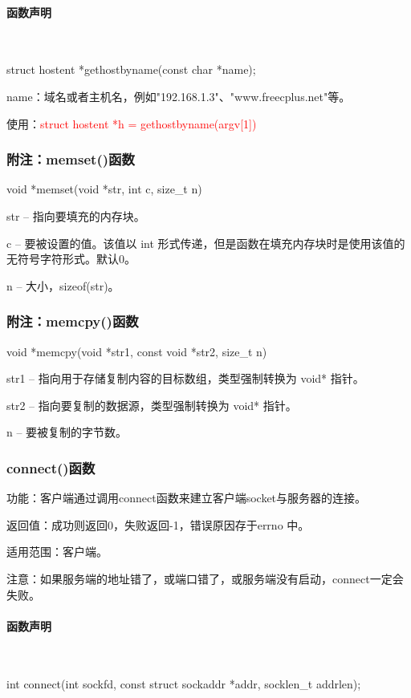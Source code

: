 \documentclass[UTF8]{article}%
\begin{document}
\paragraph{函数声明}~{}

struct hostent *gethostbyname(const char *name);

name：域名或者主机名，例如"192.168.1.3"、"www.freecplus.net"等。

使用：\textcolor{red}{struct hostent *h = gethostbyname(argv[1])}

\subsubsection{附注：memset()函数}

void *memset(void *str, int c, size\_t n)

str -- 指向要填充的内存块。

c -- 要被设置的值。该值以 int 形式传递，但是函数在填充内存块时是使用该值的无符号字符形式。默认0。

n -- 大小，sizeof(str)。

\subsubsection{附注：memcpy()函数}

void *memcpy(void *str1, const void *str2, size\_t n)

str1 -- 指向用于存储复制内容的目标数组，类型强制转换为 void* 指针。

str2 -- 指向要复制的数据源，类型强制转换为 void* 指针。

n -- 要被复制的字节数。

\subsubsection{connect()函数}

功能：客户端通过调用connect函数来建立客户端socket与服务器的连接。

返回值：成功则返回0，失败返回-1，错误原因存于errno 中。

适用范围：客户端。

注意：如果服务端的地址错了，或端口错了，或服务端没有启动，connect一定会失败。

\paragraph{函数声明}~{}

int connect(int sockfd, const struct sockaddr *addr, socklen\_t addrlen);
\end{document}
